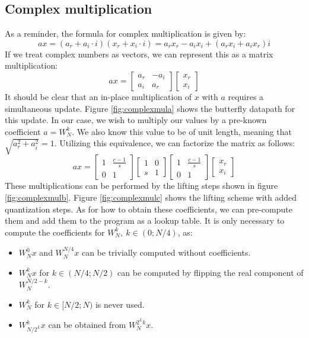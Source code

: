 \subsection{Complex multiplication}
As a reminder, the formula for complex multiplication is given by:
\begin{equation}
    ax = (a_r + a_i \cdot i)(x_r + x_i \cdot i) = a_rx_r - a_ix_i + (a_r x_i + a_ix_r)i
\end{equation}
If we treat complex numbers as vectors, we can represent this as a matrix multiplication:
\begin{equation}
    ax =
    \begin{bmatrix}
        a_r &-a_i\\
        a_i &a_r
    \end{bmatrix}
    \begin{bmatrix}
        x_r\\
        x_i
    \end{bmatrix}
\end{equation}
It should be clear that an in-place multiplication of $x$ with $a$ requires a simultaneous update.
Figure \ref{fig:complexmula} shows the butterfly datapath for this update.
In our case, we wish to multiply our values by a pre-known coefficient $a = W_N^k$.
We also know this value to be of unit length, meaning that $\sqrt{a_r^2 + a_i^2} = 1$.
Utilizing this equivalence, we can factorize the matrix as follows:
\begin{equation}
    ax =
    \begin{bmatrix}
        1 &\frac{c-1}{s}\\
        0 &1
    \end{bmatrix}
    \begin{bmatrix}
        1 &0\\
        s &1
    \end{bmatrix}
    \begin{bmatrix}
        1 &\frac{c - 1}{s}\\
        0 &1
    \end{bmatrix}
    \begin{bmatrix}
        x_r\\
        x_i
    \end{bmatrix}
\end{equation}
These multiplications can be performed by the lifting steps shown in figure \ref{fig:complexmulb}.
Figure \ref{fig:complexmulc} shows the lifting scheme with added quantization steps.
As for how to obtain these coefficients,
we can pre-compute them and add them to the program as a lookup table.
It is only necessary to compute the coefficients for $W_N^k,~k \in (0;N/4)$, as:
\begin{itemize}
    \item $W_N^0 x$ and $W_N^{N/4} x$ can be trivially computed without coefficients.
    \item $W_N^k x$ for $k \in (N/4; N/2)$
        can be computed by flipping the real component of $W_N^{N/2 - k}$.
    \item $W_N^k$ for $k \in [N/2;N)$ is never used.
    \item $W_{N/2^L}^k x$ can be obtained from $W_N^{2^L k} x$.
\end{itemize}

